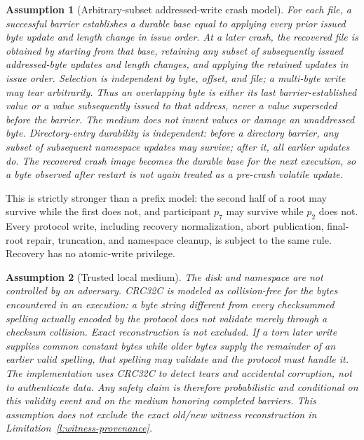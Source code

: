 \documentclass[10pt,twocolumn]{article}
\newtheorem{assumption}{Assumption}
\theoremstyle{remark}
\begin{document}
\begin{assumption}[Arbitrary-subset addressed-write crash model]\label{a:fault}
For each file, a successful barrier establishes a durable base equal to applying every prior issued
byte update and length change in issue order. At a later crash, the recovered file is obtained by
starting from that base, retaining any subset of subsequently issued addressed-byte updates and
length changes, and applying the retained updates in issue order. Selection is independent by byte,
offset, and file; a multi-byte write may tear arbitrarily. Thus an overlapping byte is either its
last barrier-established value or a value subsequently issued to that address, never a value
superseded before the barrier. The medium does not invent values or damage an unaddressed byte.
Directory-entry durability is independent: before a directory barrier, any subset of subsequent
namespace updates may survive; after it, all earlier updates do. The recovered crash image becomes
the durable base for the next execution, so a byte observed after restart is not again treated as a
pre-crash volatile update.
\end{assumption}

This is strictly stronger than a prefix model: the second half of a root may survive while the
first does not, and participant $p_7$ may survive while $p_2$ does not. Every protocol write,
including recovery normalization, abort publication, final-root repair, truncation, and namespace
cleanup, is subject to the same rule. Recovery has no atomic-write privilege.

\begin{assumption}[Trusted local medium]\label{a:trusted}
The disk and namespace are not controlled by an adversary. CRC32C is modeled as collision-free for
the bytes encountered in an execution: a byte string different from every checksummed spelling
actually encoded by the protocol does not validate merely through a checksum collision. Exact
reconstruction is \emph{not} excluded. If a torn later write supplies common constant bytes while
older bytes supply the remainder of an earlier valid spelling, that spelling may validate and the
protocol must handle it. The implementation uses CRC32C to detect tears and accidental corruption,
not to authenticate data. Any safety claim is therefore probabilistic and conditional on this
validity event and on the medium honoring completed barriers. This assumption does not exclude the
exact old/new witness reconstruction in Limitation~\ref{l:witness-provenance}.
\end{assumption}
\end{document}
